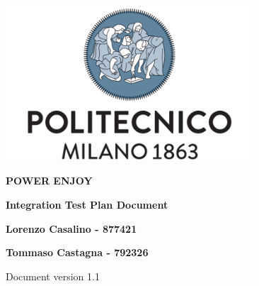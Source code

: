 \begin{titlepage}
        \begin{center}
                \includegraphics[width=350px]{../Datas/images/polimi.png}

                \vspace*{2.0cm}

                {\Huge \textbf{POWER ENJOY}\par}

                \vspace*{1.0cm}

                {\LARGE \textbf{Integration Test Plan Document}\par}

                \vspace*{2.0cm}

                {\normalsize
                \textbf{Lorenzo Casalino - 877421}\par
                \textbf{Tommaso Castagna - 792326}\par
                }

                \vfill
                Document version 1.1
        \end{center}
\end{titlepage}

